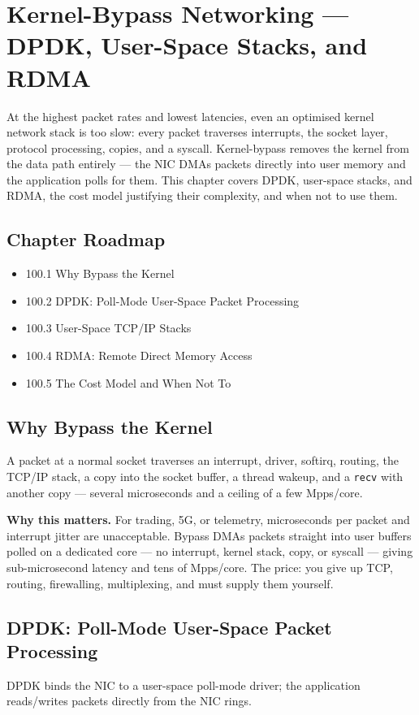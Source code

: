 \chapter{Kernel-Bypass Networking --- DPDK, User-Space Stacks, and RDMA}

At the highest packet rates and lowest latencies, even an optimised kernel network stack is too slow: every packet traverses interrupts, the socket layer, protocol processing, copies, and a syscall. Kernel-bypass removes the kernel from the data path entirely --- the NIC DMAs packets directly into user memory and the application polls for them. This chapter covers DPDK, user-space stacks, and RDMA, the cost model justifying their complexity, and when not to use them.

\section*{Chapter Roadmap}
\begin{itemize}
\item 100.1 Why Bypass the Kernel
\item 100.2 DPDK: Poll-Mode User-Space Packet Processing
\item 100.3 User-Space TCP/IP Stacks
\item 100.4 RDMA: Remote Direct Memory Access
\item 100.5 The Cost Model and When Not To
\end{itemize}

\section{Why Bypass the Kernel}
A packet at a normal socket traverses an interrupt, driver, softirq, routing, the TCP/IP stack, a copy into the socket buffer, a thread wakeup, and a \texttt{recv} with another copy --- several microseconds and a ceiling of a few Mpps/core.

\textbf{Why this matters.} For trading, 5G, or telemetry, microseconds per packet and interrupt jitter are unacceptable. Bypass DMAs packets straight into user buffers polled on a dedicated core --- no interrupt, kernel stack, copy, or syscall --- giving sub-microsecond latency and tens of Mpps/core. The price: you give up TCP, routing, firewalling, multiplexing, and must supply them yourself.

\section{DPDK: Poll-Mode User-Space Packet Processing}
DPDK binds the NIC to a user-space poll-mode driver; the application reads/writes packets directly from the NIC rings.

